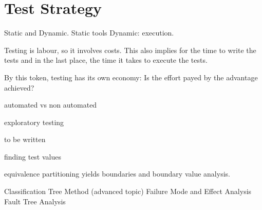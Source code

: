 \documentclass[\docroot/main]{subfiles}
\begin{document}
\chapter{Test Strategy}
Static and Dynamic.
Static tools
Dynamic: execution.

Testing is labour, so it involves costs. This also implies for the
time to write the tests and in the last place, the time it takes to
execute the tests.

By this token, testing has its own economy: Is the effort payed by the
advantage achieved?


automated vs non automated

exploratory testing 

to be written

finding test values


equivalence partitioning yields boundaries and boundary value
analysis.


Classification Tree Method (advanced topic)
Failure Mode and Effect Analysis
Fault Tree Analysis
\end{document}
